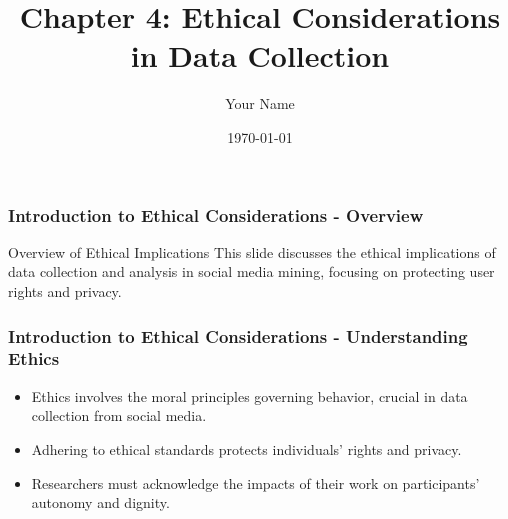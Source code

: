 \documentclass{beamer}
\title{Chapter 4: Ethical Considerations in Data Collection}
\author{Your Name}
\institute{Your Institution}
\date{\today}
\begin{document}
\frame{\titlepage}

\begin{frame}[fragile]
    \frametitle{Introduction to Ethical Considerations - Overview}
    \begin{block}{Overview of Ethical Implications}
        This slide discusses the ethical implications of data collection and analysis in social media mining, focusing on protecting user rights and privacy.
    \end{block}
\end{frame}

\begin{frame}[fragile]
    \frametitle{Introduction to Ethical Considerations - Understanding Ethics}
    \begin{itemize}
        \item Ethics involves the moral principles governing behavior, crucial in data collection from social media.
        \item Adhering to ethical standards protects individuals' rights and privacy.
        \item Researchers must acknowledge the impacts of their work on participants' autonomy and dignity.
    \end{itemize}
\end{frame}
\end{document}
